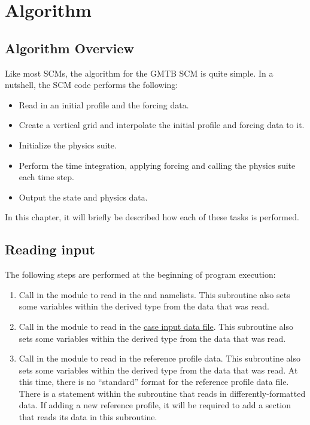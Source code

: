 \chapter{Algorithm}
\label{chapter: algorithm}

\section{Algorithm Overview}

Like most SCMs, the algorithm for the GMTB SCM is quite simple. In a nutshell, the SCM code performs the following:
\begin{itemize}
\item Read in an initial profile and the forcing data.
\item Create a vertical grid and interpolate the initial profile and forcing data to it.
\item Initialize the physics suite.
\item Perform the time integration, applying forcing and calling the physics suite each time step.
\item Output the state and physics data.
\end{itemize}
In this chapter, it will briefly be described how each of these tasks is performed.

\section{Reading input}
The following steps are performed at the beginning of program execution:
\begin{enumerate}
\item Call  in the  module to read in the \hyperref[subsection: case config]{} and \hyperref[subsection: physics config]{} namelists. This subroutine also sets some variables within the  derived type from the data that was read.
\item Call  in the  module to read in the \hyperref[subsection: case input]{case input data file}. This subroutine also sets some variables within the  derived type from the data that was read.
\item Call  in the  module to read in the reference profile data. This subroutine also sets some variables within the  derived type from the data that was read. At this time, there is no ``standard'' format for the reference profile data file. There is a  statement within the  subroutine that reads in differently-formatted data. If adding a new reference profile, it will be required to add a section that reads its data in this subroutine.
\end{enumerate}

